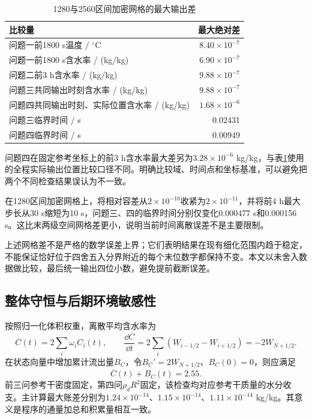 \begin{table}[H]\centering
\caption{1280与2560区间加密网格的最大输出差}\label{tab:errors}
\small
\begin{tabularx}{\linewidth}{Xr}
\toprule 比较量 & 最大绝对差\\\midrule
问题一前1800 s温度 / $^\circ$C & $8.40\times10^{-7}$\\
问题一前1800 s含水率 / (kg/kg) & $6.90\times10^{-7}$\\
问题二前3 h含水率 / (kg/kg) & $9.88\times10^{-7}$\\
问题三共同输出时刻含水率 / (kg/kg) & $9.88\times10^{-7}$\\
问题四共同输出时刻、实际位置含水率 / (kg/kg) & $1.68\times10^{-6}$\\
问题三临界时间 / s & 0.02431\\
问题四临界时间 / s & 0.00949\\
\bottomrule
\end{tabularx}
\end{table}

问题四在固定参考坐标上的前3 h含水率最大差另为$3.28\times10^{-6}$ kg/kg，与表\ref{tab:errors}使用的全程实际输出位置比较口径不同。明确比较域、时间点和坐标基准，可以避免把两个不同检查结果误认为不一致。

在1280区间加密网格上，将相对容差从$2\times10^{-10}$收紧为$2\times10^{-11}$，并将前4 h最大步长从30 s缩短为10 s，问题三、四的临界时间分别仅变化0.000477 s和0.000156 s。这比末两级空间网格差更小，说明当前时间离散误差不是主要限制。

上述网格差不是严格的数学误差上界；它们表明结果在现有细化范围内趋于稳定，不能保证恰好位于四舍五入分界附近的每个末位数字都保持不变。本文以未舍入数据做比较，最后统一输出四位小数，避免提前截断误差。

\nextpage
\subsection{整体守恒与后期环境敏感性}
按照归一化体积权重，离散平均含水率为
\begin{equation}
\overline C(t)=2\sum_i\omega_i C_i(t),\qquad
\frac{\dd\overline C}{\dd t}
=2\sum_i(W_{i-1/2}-W_{i+1/2})=-2W_{N+1/2}.
\end{equation}
在状态向量中增加累计流出量$B_C$，令$B_C'=2W_{N+1/2}$、$B_C(0)=0$，则应满足
\begin{equation}
\overline C(t)+B_C(t)=2.55 .
\label{eq:masscheck}
\end{equation}
前三问参考干密度固定，第四问$\rho_dR^2$固定，该检查均对应参考干质量的水分收支。主计算最大账差分别为$1.24\times10^{-14}$、$1.15\times10^{-14}$、$1.11\times10^{-14}$ kg/kg。其意义是程序的通量加总和积累量相互一致。


